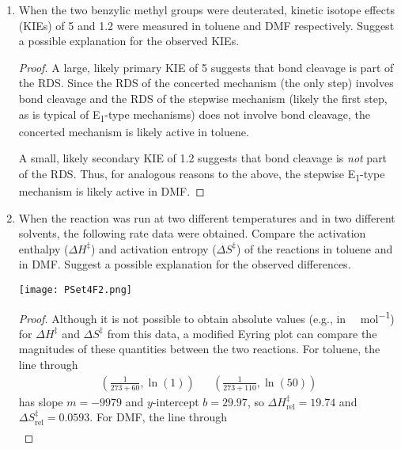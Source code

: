 \documentclass[../psets.tex]{subfiles}
\begin{document}
\begin{enumerate}
\begin{enumerate}
\begin{proof}
\begin{center}
{                }
            \end{center}
        \end{proof}
        \item When the two benzylic methyl groups were deuterated, kinetic isotope effects (KIEs) of 5 and 1.2 were measured in toluene and DMF respectively. Suggest a possible explanation for the observed KIEs.
        \begin{proof}
            A large, likely primary KIE of 5 suggests that  bond cleavage is part of the RDS. Since the RDS of the concerted mechanism (the only step) involves  bond cleavage and the RDS of the stepwise mechanism (likely the first step, as is typical of E\textsubscript{1}-type mechanisms) does not involve  bond cleavage, the concerted mechanism is likely active in toluene.\par
            A small, likely secondary KIE of 1.2 suggests that  bond cleavage is \emph{not} part of the RDS. Thus, for analogous reasons to the above, the stepwise E\textsubscript{1}-type mechanism is likely active in DMF.
        \end{proof}
        \pagebreak
        \item When the reaction was run at two different temperatures and in two different solvents, the following rate data were obtained. Compare the activation enthalpy ($\Delta H^\ddagger$) and activation entropy ($\Delta S^\ddagger$) of the reactions in toluene and in DMF. Suggest a possible explanation for the observed differences.
        \begin{center}
            \texttt{[image: PSet4F2.png]}
        \end{center}
        \begin{proof}
            Although it is not possible to obtain absolute values (e.g., in \si{\kilo\calorie\per\mole}) for $\Delta H^\ddagger$ and $\Delta S^\ddagger$ from this data, a modified Eyring plot can compare the magnitudes of these quantities between the two reactions. For toluene, the line through
            \begin{align*}
                \left( \frac{1}{273+60},\ln(1) \right)&&
                \left( \frac{1}{273+110},\ln(50) \right)
            \end{align*}
            has slope $m=-9979$ and $y$-intercept $b=29.97$, so $\Delta H^\ddagger_\text{rel}=19.74$ and $\Delta S^\ddagger_\text{rel}=0.0593$. For DMF, the line through
            \begin{align*}

\end{align*}
\end{proof}
\end{enumerate}
\end{enumerate}
\end{document}
